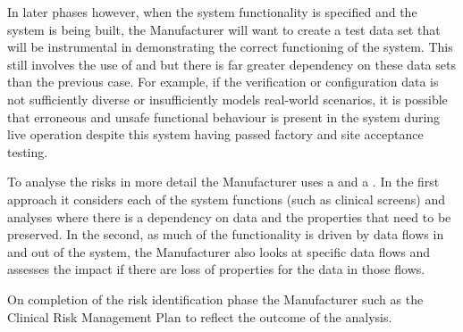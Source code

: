 In later phases however, when the system functionality is specified and the system is being built, the Manufacturer will want to create a test data set that will be instrumental in demonstrating the correct functioning of the system. This still involves the use of  and  but there is far greater dependency on these data sets than the previous case. For example, if the verification or \gls{configuration data} is not sufficiently diverse or insufficiently models real-world scenarios, it is possible that erroneous and unsafe functional behaviour is present in the system during live operation despite this system having passed factory and site acceptance testing.

To analyse the risks in more detail the Manufacturer uses a  and a . In the first approach it considers each of the system functions (such as clinical screens) and analyses where there is a dependency on data and the properties that need to be preserved. In the second, as much of the functionality is driven by data flows in and out of the system, the Manufacturer also looks at specific data flows and assesses the impact if there are loss of properties for the data in those flows.

On completion of the risk identification phase the Manufacturer  such as the Clinical Risk Management Plan to reflect the outcome of the analysis.

